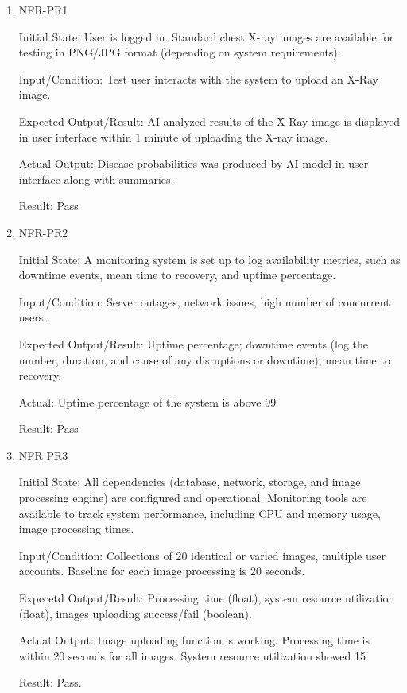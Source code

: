 \documentclass[12pt, titlepage]{article}
\begin{document}
\begin{enumerate}
\item{NFR-PR1\\} \label{NFR-PR1}

Initial State: User is logged in. Standard chest X-ray images are available for testing in PNG/JPG format (depending on system requirements).

Input/Condition: Test user interacts with the system to upload an X-Ray image.

Expected Output/Result: AI-analyzed results of the X-Ray image is displayed in user interface within 1 minute of uploading the X-ray image.

Actual Output: Disease probabilities was produced by AI model in user interface along with summaries.

Result: Pass

\item{NFR-PR2\\}\label{NFR-PR2}

Initial State: A monitoring system is set up to log availability metrics, such as downtime events, mean time to recovery, and uptime percentage.

Input/Condition: Server outages, network issues, high number of concurrent users.

Expected Output/Result: Uptime percentage; downtime events (log the number, duration, and cause of any disruptions or downtime); mean time to recovery.

Actual: Uptime percentage of the system is above 99%

Result: Pass

\item{NFR-PR3\\}\label{NFR-PR3}

Initial State: All dependencies (database, network, storage, and image processing engine) are configured and operational. Monitoring tools are available to track system performance, including CPU and memory usage, image processing times.

Input/Condition: Collections of 20 identical or varied images, multiple user accounts. Baseline for each image processing is 20 seconds.

Expecetd Output/Result: Processing time (float), system resource utilization (float), images uploading success/fail (boolean).

Actual Output: Image uploading function is working. Processing time is within 20 seconds for all images. System resource utilization showed 15%

Result: Pass.

\end{enumerate}
\end{document}
